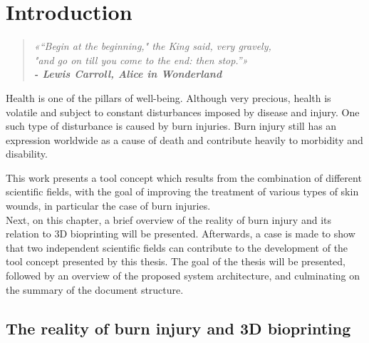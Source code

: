 \newcommand{\novathesis}{\emph{novathesis}}
\newcommand{\novathesisclass}{\texttt{novathesis.cls}}


\chapter{Introduction}
\label{cha:introduction}

\begin{quotation}
\begin{flushright}
\itshape
«“Begin at the beginning," the King said, very gravely, \\"and go on till you come to the end: then stop.”»\\
\textbf{- Lewis Carroll, Alice in Wonderland}
\end{flushright}
\end{quotation}

Health is one of the pillars of well-being. Although very precious, health is volatile and subject to constant disturbances imposed by disease and injury. One such type of disturbance is caused by burn injuries. Burn injury still has an expression worldwide as a cause of death and contribute heavily to morbidity and disability.

This work presents a tool concept which results from the combination of different scientific fields, with the goal of improving the treatment of various types of skin wounds, in particular the case of burn injuries.\\

Next, on this chapter, a brief overview of the reality of burn injury and its relation to 3D bioprinting will be presented. Afterwards, a case is made to show that two independent scientific fields can contribute to the development of the tool concept presented by this thesis. The goal of the thesis will be presented, followed by an overview of the proposed system architecture, and culminating on the summary of the document structure.

\section{The reality of burn injury and 3D bioprinting} %
\label{sec:the_reality_of_burn_injury}

